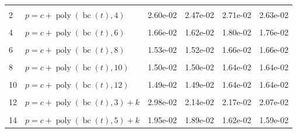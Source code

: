 \documentclass[12pt,a4paper]{article}
\DeclareMathOperator{\bc}{bc}
\DeclareMathOperator{\poly}{poly}
\begin{document}
\begin{longtable}[t]{ll>{\raggedleft\arraybackslash}p{2cm}>{\raggedleft\arraybackslash}p{2cm}>{\raggedleft\arraybackslash}p{2cm}>{\raggedleft\arraybackslash}p{2cm}}
\endfoot
\bottomrule
\endlastfoot
\cellcolor{gray!6}{1} & \cellcolor{gray!6}{$p = c + \poly\left( \bc(t), 3 \right)$} & \cellcolor{gray!6}{3.13e-02} & \cellcolor{gray!6}{2.37e-02} & \cellcolor{gray!6}{2.52e-02} & \cellcolor{gray!6}{2.44e-02}\\
2 & $p = c + \poly\left( \bc(t), 4 \right)$ & 2.60e-02 & 2.47e-02 & 2.71e-02 & 2.63e-02\\
\cellcolor{gray!6}{3} & \cellcolor{gray!6}{$p = c + \poly\left( \bc(t), 5 \right)$} & \cellcolor{gray!6}{2.18e-02} & \cellcolor{gray!6}{2.15e-02} & \cellcolor{gray!6}{2.07e-02} & \cellcolor{gray!6}{2.06e-02}\\
4 & $p = c + \poly\left( \bc(t), 6 \right)$ & 1.66e-02 & 1.62e-02 & 1.80e-02 & 1.76e-02\\
\cellcolor{gray!6}{5} & \cellcolor{gray!6}{$p = c + \poly\left( \bc(t), 7 \right)$} & \cellcolor{gray!6}{1.62e-02} & \cellcolor{gray!6}{1.58e-02} & \cellcolor{gray!6}{1.72e-02} & \cellcolor{gray!6}{1.71e-02}\\
6 & $p = c + \poly\left( \bc(t), 8 \right)$ & 1.53e-02 & 1.52e-02 & 1.66e-02 & 1.66e-02\\
\cellcolor{gray!6}{7} & \cellcolor{gray!6}{$p = c + \poly\left( \bc(t), 9 \right)$} & \cellcolor{gray!6}{1.52e-02} & \cellcolor{gray!6}{1.51e-02} & \cellcolor{gray!6}{1.66e-02} & \cellcolor{gray!6}{1.66e-02}\\
8 & $p = c + \poly\left( \bc(t), 10 \right)$ & 1.50e-02 & 1.50e-02 & 1.64e-02 & 1.64e-02\\
\cellcolor{gray!6}{9} & \cellcolor{gray!6}{$p = c + \poly\left( \bc(t), 11 \right)$} & \cellcolor{gray!6}{1.50e-02} & \cellcolor{gray!6}{1.49e-02} & \cellcolor{gray!6}{1.64e-02} & \cellcolor{gray!6}{1.64e-02}\\
10 & $p = c + \poly\left( \bc(t), 12 \right)$ & 1.49e-02 & 1.49e-02 & 1.64e-02 & 1.64e-02\\
\cellcolor{gray!6}{11} & \cellcolor{gray!6}{$p = c + \poly\left( \bc(t), 13 \right)$} & \cellcolor{gray!6}{1.49e-02} & \cellcolor{gray!6}{1.49e-02} & \cellcolor{gray!6}{1.64e-02} & \cellcolor{gray!6}{1.64e-02}\\
12 & $p = c + \poly\left( \bc(t), 3 \right) + k$ & 2.98e-02 & 2.14e-02 & 2.17e-02 & 2.07e-02\\
\cellcolor{gray!6}{13} & \cellcolor{gray!6}{$p = c + \poly\left( \bc(t), 4 \right) + k$} & \cellcolor{gray!6}{2.42e-02} & \cellcolor{gray!6}{2.26e-02} & \cellcolor{gray!6}{2.39e-02} & \cellcolor{gray!6}{2.29e-02}\\
14 & $p = c + \poly\left( \bc(t), 5 \right) + k$ & 1.95e-02 & 1.89e-02 & 1.62e-02 & 1.59e-02\\

\end{longtable}
\end{document}
